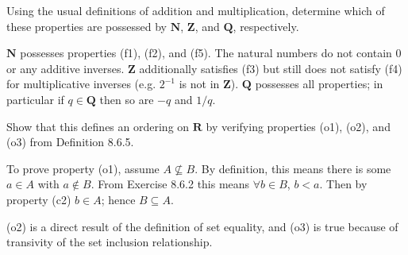 \begin{exercise}
Using the usual definitions of addition and multiplication, determine which of these properties are possessed by \(\mathbf{N}\), \(\mathbf{Z}\), and \(\mathbf{Q}\), respectively.
\end{exercise}
\begin{solution}
\(\mathbf{N}\) possesses properties (f1), (f2), and (f5). The natural numbers do not contain 0 or any additive inverses. \(\mathbf{Z}\) additionally satisfies (f3) but still does not satisfy (f4) for multiplicative inverses (e.g. \(2^{-1}\) is not in \(\mathbf{Z}\)). \(\mathbf{Q}\) possesses all properties; in particular if \(q \in \mathbf{Q}\) then so are \(-q\) and \(1/q\).
\end{solution}

\begin{exercise}
Show that this defines an ordering on \(\mathbf{R}\) by verifying properties (o1), (o2), and (o3) from Definition 8.6.5.
\end{exercise}
\begin{solution}
To prove property (o1), assume \(A \nsubseteq B\). By definition, this means there is some  \(a \in A\) with \(a \notin B\). From Exercise 8.6.2 this means \(\forall b \in B\), \(b < a\). Then by property (c2) \(b \in A\); hence \(B \subseteq A\).

(o2) is a direct result of the definition of set equality, and (o3) is true because of transivity of the set inclusion relationship.
\end{solution}

